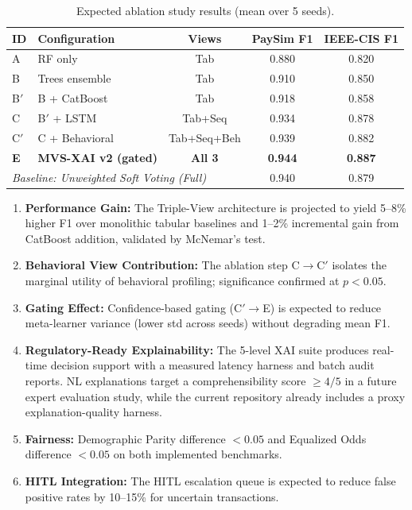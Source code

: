 \documentclass[10pt,a4paper,twocolumn]{article}
\begin{document}
\begin{table}[H]
\centering
\caption{Expected ablation study results (mean over 5 seeds).}
\label{tab:expected}
{\footnotesize
\begin{tabularx}{\linewidth}{@{}lXccc@{}}
\toprule
\textbf{ID} & \textbf{Configuration} & \textbf{Views} & \textbf{PaySim F1} & \textbf{IEEE-CIS F1} \\
\midrule
A & RF only                    & Tab       & 0.880 & 0.820 \\
B & Trees ensemble             & Tab       & 0.910 & 0.850 \\
B$'$ & B + CatBoost            & Tab       & 0.918 & 0.858 \\
C & B$'$ + LSTM                & Tab+Seq   & 0.934 & 0.878 \\
C$'$ & C + Behavioral          & Tab+Seq+Beh & 0.939 & 0.882 \\
\textbf{E} & \textbf{MVS-XAI v2 (gated)} & \textbf{All 3} & \textbf{0.944} & \textbf{0.887} \\
\midrule
\multicolumn{3}{l}{\textit{Baseline: Unweighted Soft Voting (Full)}} & 0.940 & 0.879 \\
\bottomrule
\end{tabularx}
}
\end{table}

\begin{enumerate}
    \item \textbf{Performance Gain:} The Triple-View architecture is projected to yield 5--8\% higher F1 over monolithic tabular baselines and 1--2\% incremental gain from CatBoost addition, validated by McNemar's test.
    \item \textbf{Behavioral View Contribution:} The ablation step C$\to$C$'$ isolates the marginal utility of behavioral profiling; significance confirmed at $p < 0.05$.
    \item \textbf{Gating Effect:} Confidence-based gating (C$' \to$E) is expected to reduce meta-learner variance (lower std across seeds) without degrading mean F1.
    \item \textbf{Regulatory-Ready Explainability:} The 5-level XAI suite produces real-time decision support with a measured latency harness and batch audit reports. NL explanations target a comprehensibility score $\geq 4/5$ in a future expert evaluation study, while the current repository already includes a proxy explanation-quality harness.
    \item \textbf{Fairness:} Demographic Parity difference $< 0.05$ and Equalized Odds difference $< 0.05$ on both implemented benchmarks.
    \item \textbf{HITL Integration:} The HITL escalation queue is expected to reduce false positive rates by 10--15\% for uncertain transactions.
\end{enumerate}
\end{document}
